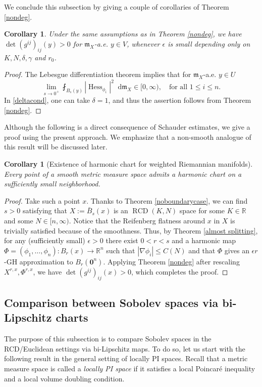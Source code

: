\documentclass[11pt,reqno]{amsart}
\newtheorem{corollary}[theorem]{Corollary}
\theoremstyle{definition}
\numberwithin{equation}{section}
\newcommand{\bo}{\bm{0}}
\newcommand{\di}{\mathop{}\!\mathrm{d}}
\newcommand{\meas}{\mathfrak{m}}
\DeclareMathOperator{\Hess}{Hess}
\DeclareMathOperator{\RCD}{RCD}
\begin{document}
We conclude this subsection by giving a couple of corollaries of Theorem \ref{nondeg}.
\begin{corollary}
Under the same assumptions as in Theorem \ref{nondeg},
 we have $
     \det (g^{ij})_{ij} (y)>0
 $
  for $\meas_X$-a.e. $y \in V$, whenever $\epsilon$ is small depending only on $K, N, \delta, \gamma$ and $r_0$. 
\end{corollary}
\begin{proof}
 The Lebesgue differentiation theorem implies that for $\meas_X$-a.e. $y \in U$
\begin{equation}
\lim_{s\to 0^+}\fint_{B_s(y)}|\Hess_{\phi_i}|^2\di \meas_X \in [0, \infty),\quad \text{for all $1\leq i \leq n$.}
\end{equation}
In \eqref{deltacond}, one can take $\delta=1$, and thus 
the assertion follows from Theorem \ref{nondeg}.
\end{proof}
Although the following is a direct consequence of Schauder estimates, we give a proof using the present approach. We emphasize that 
a non-smooth analogue of this result will be discussed later.
\begin{corollary}[Existence of harmonic chart for weighted Riemannian manifolds]\label{harmcha}
Every point of a smooth metric measure space admits a harmonic chart on a sufficiently small neighborhood.  
\end{corollary}
\begin{proof}
Take such a point $x$.
Thanks to Theorem \ref{noboundarycase}, we can find $s>0$ satisfying that $X:=\bar B_s(x)$ is an $\RCD(K, N)$ space for some $K \in \mathbb{R}$ and some $N \in [n, \infty)$. Notice that the Reifenberg flatness around $x$ in $X$ is trivially satisfied because of the smoothness.
Thus, by Theorem \ref{almost splitting}, for any (sufficiently small) $\epsilon>0$ there exist $0<r<s$ and a harmonic map $\Phi=(\phi_1, \ldots, \phi_n):B_r(x) \to \mathbb{R}^n$ such that $|\nabla \phi_i| \le C(N)$ and that $\Phi$ gives an $\epsilon r$-GH approximation to $B_r(\bo^n)$.
Applying Theorem \ref{nondeg} after rescaling $X^{r, x}, \Phi^{r, x}$, we have $\det(g^{ij})_{ij}(x)>0$, which completes the proof.
\end{proof}



\subsection{Comparison between Sobolev spaces via bi-Lipschitz charts}
The purpose of this subsection is to compare Sobolev spaces in the RCD/Euclidean settings via bi-Lipschitz maps. To do so, let us start with  the following result in the general setting of locally PI spaces. 
Recall that a metric measure space is called a {\it  locally PI space} if 
it satisfies a local Poincar\'e inequality and a local volume doubling condition. 
\end{document}
